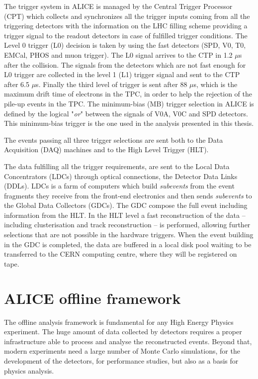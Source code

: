 The trigger system in ALICE is managed by the Central Trigger Processor (CPT) \cite{alice_trigger} 
which collects and synchronizes all the trigger inputs coming from all the triggering detectors 
with the information on the LHC filling scheme providing a trigger signal to the readout detectors
in case of fulfilled trigger conditions. 
The Level 0 trigger (L0) decision is taken by using the fast detectors (SPD, V0, T0, EMCal, PHOS and 
muon trigger). The L0 signal arrives to the CTP in 1.2 $\mu$s after the collision. 
The signals from the detectors which are not fast enough for L0 trigger are collected in the level 1
(L1) trigger signal and sent to the CTP after 6.5 $\mu$s. 
Finally the third level of trigger is sent after 88 $\mu$s, which is the maximum drift time of electrons
in the TPC, in order to help the rejection of the pile-up events in the TPC.
The minimum-bias (MB) trigger  selection in ALICE is defined by the logical "\textit{or}" between the
signals of V0A, V0C and SPD detectors. This minimum-bias trigger is the one used in the analysis
presented in this thesis.

The events passing all three trigger selections are sent both to the Data Acquisition (DAQ) machines 
and to the High Level Trigger (HLT).


The data fulfilling all the trigger requirements, are sent to the Local Data Concentrators (LDCs)
through optical connections, the Detector Data Links (DDLs).
LDCs is a farm of computers which build \textit{subevents} from the event fragments they receive from
the front-end electronics and then sends \textit{subevents} to the Global Data Collectors (GDCs).
The GDC compose the full event including information from the HLT.
In the HLT level a fast reconstruction of the data -- including clusterisation and track reconstruction --
is performed, allowing further selections that are not possible in the hardware triggers.
When the event building in the GDC is completed, the data are buffered in a local disk pool waiting 
to be transferred to the CERN computing centre, where they will be registered on tape.

%
%
\section{ALICE offline framework} \label{sec:offline}

The offline analysis framework is fundamental for any High Energy Physics experiment.
The huge amount of data collected by detectors requires a proper infrastructure able to process and 
analyse the reconstructed events.
Beyond that, modern experiments need a large number of Monte Carlo simulations, for the development of
the detectors, for performance studies, but also as a basis for physics analysis.

